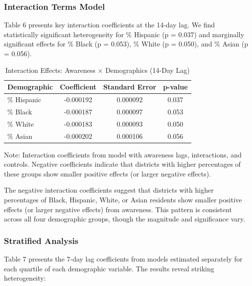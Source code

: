 \documentclass[11pt,a4paper]{article}
\begin{document}
\subsubsection{Interaction Terms Model}

Table 6 presents key interaction coefficients at the 14-day lag. We find statistically significant heterogeneity for \% Hispanic (p = 0.037) and marginally significant effects for \% Black (p = 0.053), \% White (p = 0.050), and \% Asian (p = 0.056).

\begin{table}[H]
\centering
\caption{Interaction Effects: Awareness × Demographics (14-Day Lag)}
\label{tab:interactions}
\begin{tabular}{lccc}
\toprule
Demographic & Coefficient & Standard Error & p-value \\
\midrule
\% Hispanic & -0.000192 & 0.000092 & 0.037 \\
\% Black & -0.000187 & 0.000097 & 0.053 \\
\% White & -0.000183 & 0.000093 & 0.050 \\
\% Asian & -0.000202 & 0.000106 & 0.056 \\
\bottomrule
\end{tabular}
\footnotesize
Note: Interaction coefficients from model with awareness lags, interactions, and controls. Negative coefficients indicate that districts with higher percentages of these groups show smaller positive effects (or larger negative effects).
\end{table}

The negative interaction coefficients suggest that districts with higher percentages of Black, Hispanic, White, or Asian residents show smaller positive effects (or larger negative effects) from awareness. This pattern is consistent across all four demographic groups, though the magnitude and significance vary.

\subsubsection{Stratified Analysis}

Table 7 presents the 7-day lag coefficients from models estimated separately for each quartile of each demographic variable. The results reveal striking heterogeneity:
\end{document}
